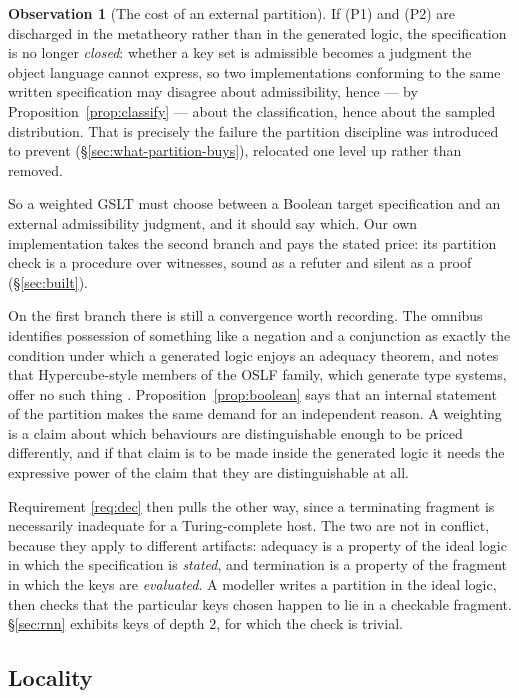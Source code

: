 \documentclass[11pt,a4paper]{article}
\theoremstyle{plain}
\theoremstyle{definition}
\newtheorem{observation}[theorem]{Observation}
\theoremstyle{remark}
\begin{document}
\begin{observation}[The cost of an external partition]
\label{obs:closure}
If (P1) and (P2) are discharged in the metatheory rather than in the generated logic, the
specification is no longer \emph{closed}: whether a key set is admissible becomes a judgment the
object language cannot express, so two implementations conforming to the same written specification
may disagree about admissibility, hence --- by Proposition~\ref{prop:classify} --- about the
classification, hence about the sampled distribution. That is precisely the failure the partition
discipline was introduced to prevent (\S\ref{sec:what-partition-buys}), relocated one level up
rather than removed.
\end{observation}

So a weighted GSLT must choose between a Boolean target specification and an external admissibility
judgment, and it should say which. Our own implementation takes the second branch and pays the stated
price: its partition check is a procedure over witnesses, sound as a refuter and silent as a proof
(\S\ref{sec:built}).

On the first branch there is still a convergence worth recording. The omnibus identifies possession
of something like a negation and a conjunction as exactly the condition under which a generated logic
enjoys an adequacy theorem, and notes that Hypercube-style members of the OSLF family, which generate
type systems, offer no such thing \cite{omnibus}. Proposition~\ref{prop:boolean} says that an
internal statement of the partition makes the same demand for an independent reason. A weighting is a
claim about which behaviours are distinguishable enough to be priced differently, and if that claim
is to be made inside the generated logic it needs the expressive power of the claim that they are
distinguishable at all.

Requirement \ref{req:dec} then pulls the other way, since a terminating fragment is necessarily
inadequate for a Turing-complete host. The two are not in conflict, because they apply to different
artifacts: adequacy is a property of the ideal logic in which the specification is \emph{stated},
and termination is a property of the fragment in which the keys are \emph{evaluated}. A modeller
writes a partition in the ideal logic, then checks that the particular keys chosen happen to lie in
a checkable fragment. \S\ref{sec:rnn} exhibits keys of depth $2$, for which the check is trivial.

\subsection{Locality}
\label{sec:locality}
\end{document}
